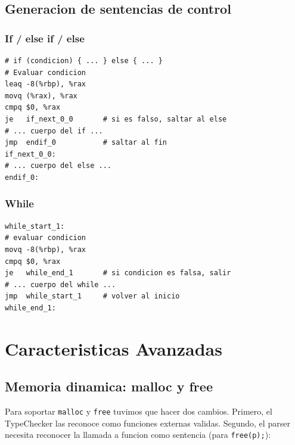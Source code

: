 \documentclass[12pt, a4paper]{article}
\begin{document}
\subsection{Generacion de sentencias de control}

\subsubsection{If / else if / else}

\begin{lstlisting}[style=asmstyle, caption={Ensamblador generado para if/else}]
# if (condicion) { ... } else { ... }
# Evaluar condicion
leaq -8(%rbp), %rax
movq (%rax), %rax
cmpq $0, %rax
je   if_next_0_0       # si es falso, saltar al else
# ... cuerpo del if ...
jmp  endif_0           # saltar al fin
if_next_0_0:
# ... cuerpo del else ...
endif_0:
\end{lstlisting}

\subsubsection{While}

\begin{lstlisting}[style=asmstyle, caption={Ensamblador generado para while}]
while_start_1:
# evaluar condicion
movq -8(%rbp), %rax
cmpq $0, %rax
je   while_end_1       # si condicion es falsa, salir
# ... cuerpo del while ...
jmp  while_start_1     # volver al inicio
while_end_1:
\end{lstlisting}

\newpage

\section{Caracteristicas Avanzadas}

\subsection{Memoria dinamica: malloc y free}

Para soportar \texttt{malloc} y \texttt{free} tuvimos que hacer dos cambios. Primero, el TypeChecker las reconoce como funciones externas validas. Segundo, el parser necesita reconocer la llamada a funcion como sentencia (para \texttt{free(p);}):
\end{document}
